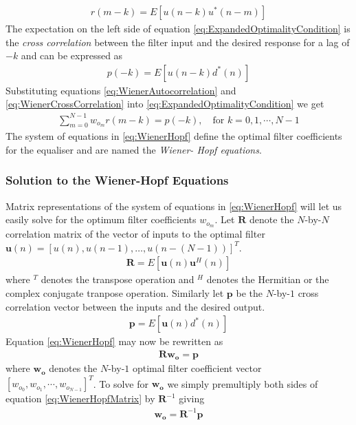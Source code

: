 \begin{align}
	r(m-k) = E\left[u(n-k)u^{*}(n-m)\right]
	\label{eq:WienerAutocorrelation}
\end{align}
The expectation on the left side of equation %
\ref{eq:ExpandedOptimalityCondition} is the %
\emph{cross correlation} between the filter %
input and the desired response for a lag %
of $-k$ and can be expressed as
\begin{align}
	p(-k) = E\left[u(n-k)d^{*}(n)\right]
	\label{eq:WienerCrossCorrelation}
\end{align}
Substituting equations \ref{eq:WienerAutocorrelation} %
and \ref{eq:WienerCrossCorrelation} into %
\ref{eq:ExpandedOptimalityCondition} %
we get
\begin{align}
	\sum_{m=0}^{N-1}w_{o_{m}}r(m-k)=p(-k),\quad
	\text{for }k=0,1,\cdots,N-1
	\label{eq:WienerHopf}
\end{align}
The system of equations in \ref{eq:WienerHopf} %
define the optimal filter coefficients for the %
equaliser and are named the \emph{Wiener-%
Hopf equations}.
\subsubsection{Solution to the Wiener-Hopf Equations}
Matrix representations of the system of equations in %
\ref{eq:WienerHopf} will let us easily solve for %
the optimum filter coefficients $w_{o_{m}}$. %
Let $\mathbf{R}$ denote the $N$-by-$N$ correlation %
matrix of the vector of inputs to the optimal filter %
$\mathbf{u}(n) = [u(n),u(n-1),\ldots,u(n-(N-1))]^T$.
\begin{align}
	\mathbf{R} = E\left[\mathbf{u}(n)\mathbf{u}^{H}(n)\right]
\end{align}
where $^{T}$ denotes the transpose operation and %
$^{H}$ denotes the Hermitian or the complex conjugate %
tranpose operation. Similarly let $\mathbf{p}$ be the %
$N$-by-$1$ cross correlation vector between %
the inputs and the desired output. 
\begin{align}
	\mathbf{p} = E\left[\mathbf{u}(n)d^{*}(n)\right]
\end{align}
Equation \ref{eq:WienerHopf} may now be rewritten %
as
\begin{align}
	\mathbf{R}\mathbf{w_{o}} = \mathbf{p}
	\label{eq:WienerHopfMatrix}
\end{align}
where $\mathbf{w_{o}}$ denotes the $N$-by-$1$ optimal %
filter coefficient vector $[w_{o_{0}},w_{o_{1}},%
\cdots,w_{o_{N-1}}]^T$. To solve for $\mathbf{w_{o}}$ %
we simply premultiply both sides of equation %
\ref{eq:WienerHopfMatrix} by $\mathbf{R}^{-1}$ giving
\begin{align}
	\mathbf{w_{o}} = \mathbf{R}^{-1}\mathbf{p}
	\label{eq:WienerHopfSolution}
\end{align}
